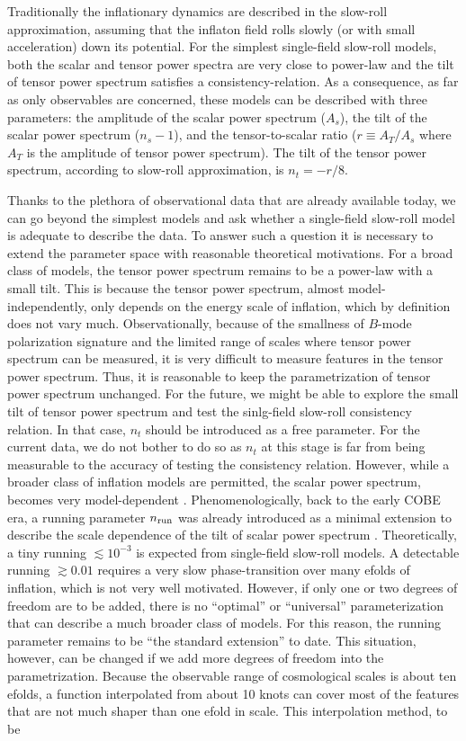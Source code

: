 \documentclass[11pt]{article}
\begin{document}
Traditionally the inflationary dynamics are described in the slow-roll approximation, assuming that the inflaton field rolls slowly (or with small acceleration) down its potential. For the simplest single-field slow-roll models, both the scalar and tensor power spectra are very close to power-law and the tilt of tensor power spectrum satisfies a consistency-relation. As a consequence, as far as only observables are concerned, these models can be described with three parameters: the amplitude of the scalar power spectrum ($A_s$), the tilt of the scalar power spectrum ($n_s-1$), and the tensor-to-scalar ratio ($r \equiv A_T/A_s$ where $A_T$ is the amplitude of tensor power spectrum). The tilt of the tensor power spectrum, according to slow-roll approximation, is $n_t = -r/8$. 


Thanks to the plethora of observational data that are already available today, we can go beyond the simplest models and ask whether a single-field slow-roll model is adequate to describe the data. To answer such a question it is necessary to extend the parameter space with reasonable theoretical motivations. For a broad class of models, the tensor power spectrum remains to be a power-law with a small tilt. This is because the tensor power spectrum, almost model-independently, only depends on the energy scale of inflation, which by definition does not vary much. Observationally, because of the smallness of $B$-mode polarization signature and the limited range of scales where tensor power spectrum can be measured, it is very difficult to measure features in the tensor power spectrum. Thus, it is reasonable to keep the parametrization of tensor power spectrum unchanged. For the future, we might be able to explore the small tilt of tensor power spectrum and test the sinlg-field slow-roll consistency relation. In that case, $n_t$ should be introduced as a free parameter. For the current data, we do not bother to do so as $n_t$ at this stage is far from being measurable to the accuracy of testing the consistency relation. However, while a broader class of inflation models are permitted, the scalar power spectrum, becomes very model-dependent \cite{Linde1996, Starobinsky1998, Lyth2003, Barnaby2009b, Bond2009}. Phenomenologically, back to the early COBE era, a running parameter $n_{\rm run}$ was already introduced as a minimal extension to describe the scale dependence of the tilt of scalar power spectrum \cite{Kosowsky1995}. Theoretically, a tiny running $\lesssim 10^{-3}$ is expected from  single-field slow-roll models. A detectable running $\gtrsim 0.01$ requires a very slow phase-transition over many efolds of inflation, which is not very well motivated. However, if only one or two degrees of freedom are to be added, there is no ``optimal'' or ``universal'' parameterization that can describe a much broader class of models. For this reason, the running parameter remains to be ``the standard extension'' to date. This situation, however, can be changed if we add more degrees of freedom into the parametrization. Because the observable range of cosmological scales is about ten efolds, a function interpolated from about 10 knots can cover most of the features that are not much shaper than one efold in scale. This interpolation method, to be 
\end{document}
